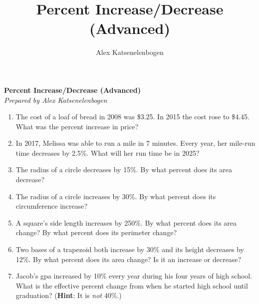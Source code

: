 \documentclass{article}
\title{Percent Increase/Decrease (Advanced)}
\author{Alex Katsenelenbogen}
\begin{document}
\begin{center}
      \Large\textbf{Percent Increase/Decrease (Advanced)}\\
      \large\textit{Prepared by Alex Katsenelenbogen}
   \end{center}

\begin{enumerate}

\item The cost of a loaf of bread in 2008 was \$3.25. In 2015 the cost rose to \$4.45. What was the percent increase in price?

\item In 2017, Melissa was able to run a mile in 7 minutes. Every year, her mile-run time decreases by 2.5\%. What will her run time be in 2025?

\item The radius of a circle decreases by 15\%. By what percent does its area decrease?

\item The radius of a circle increases by 30\%. By what percent does its circumference increase?

\item A square's side length increases by 250\%. By what percent does its area change? By what percent does its perimeter change?

\item Two bases of a trapezoid both increase by 30\% and its height decreases by 12\%. By what percent does its area change? Is it an increase or decrease?

\item Jacob's gpa increased by 10\% every year during his four years of high school. What is the effective percent change from when he started high school until graduation? (\textbf{Hint}: It is \textit{not} 40\%.)

\end{enumerate}
\end{document}
